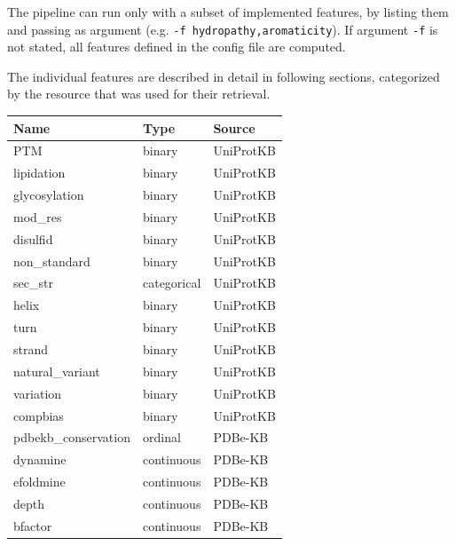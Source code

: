The pipeline can run only with a subset of implemented features, by listing them and passing as argument (e.g. \texttt{-f hydropathy,aromaticity}). If argument \texttt{-f} is not stated, all features defined in the config file are computed.

The individual features are described in detail in following sections, categorized by the resource that was used for their retrieval.

\begin{table}[]
\centering
\begin{tabular}{@{}lll@{}}
\toprule
Name                 & Type        & Source                \\ \midrule
PTM                  & binary      & UniProtKB             \\
lipidation           & binary      & UniProtKB             \\
glycosylation        & binary      & UniProtKB             \\
mod\_res             & binary      & UniProtKB             \\
disulfid             & binary      & UniProtKB             \\
non\_standard        & binary      & UniProtKB             \\
sec\_str             & categorical & UniProtKB             \\
helix                & binary      & UniProtKB             \\
turn                 & binary      & UniProtKB             \\
strand               & binary      & UniProtKB             \\
natural\_variant     & binary      & UniProtKB             \\
variation            & binary      & UniProtKB             \\
compbias             & binary      & UniProtKB             \\
pdbekb\_conservation & ordinal     & PDBe-KB               \\
dynamine             & continuous  & PDBe-KB               \\
efoldmine            & continuous  & PDBe-KB               \\
depth                & continuous  & PDBe-KB               \\
bfactor              & continuous  & PDBe-KB               \\

\end{tabular}
\end{table}
